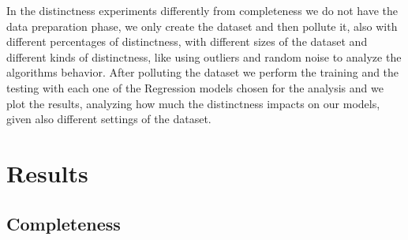 \documentclass{Configuration_Files/PoliMi3i_thesis}
\begin{document}
In the distinctness experiments differently from completeness we do not have the data preparation phase, we only create the dataset and then pollute it, also with different percentages of distinctness, with different sizes of the dataset and different kinds of distinctness, like using outliers and random noise to analyze the algorithms behavior. After polluting the dataset we perform the training and the testing with each one of the Regression models chosen for the analysis and we plot the results, analyzing how much the distinctness impacts on our models, given also different settings of the dataset.

\chapter{Results}
\label{ch:chapter_4}%

\section{Completeness}
\label{sec:section_4_1}%
\end{document}
